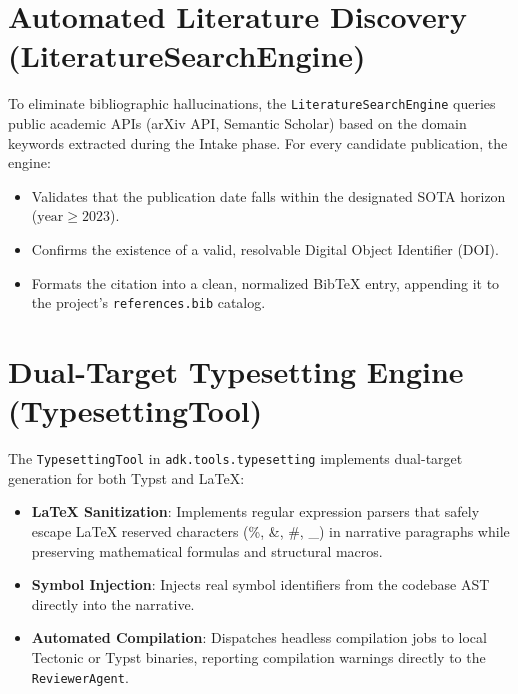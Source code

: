 \section{Automated Literature Discovery (LiteratureSearchEngine)}
\label{sec:literature_search_impl}

To eliminate bibliographic hallucinations, the \texttt{LiteratureSearchEngine} queries public academic APIs (arXiv API, Semantic Scholar) based on the domain keywords extracted during the Intake phase. For every candidate publication, the engine:
\begin{itemize}
    \item Validates that the publication date falls within the designated SOTA horizon ($\text{year} \ge 2023$).
    \item Confirms the existence of a valid, resolvable Digital Object Identifier (DOI).
    \item Formats the citation into a clean, normalized BibTeX entry, appending it to the project's \texttt{references.bib} catalog.
\end{itemize}

\section{Dual-Target Typesetting Engine (TypesettingTool)}
\label{sec:typesetting_impl}

The \texttt{TypesettingTool} in \texttt{adk.tools.typesetting} implements dual-target generation for both Typst and LaTeX:
\begin{itemize}
    \item \textbf{LaTeX Sanitization}: Implements regular expression parsers that safely escape LaTeX reserved characters (\%, \&, \#, \_) in narrative paragraphs while preserving mathematical formulas and structural macros.
    \item \textbf{Symbol Injection}: Injects real symbol identifiers from the codebase AST directly into the narrative.
    \item \textbf{Automated Compilation}: Dispatches headless compilation jobs to local Tectonic or Typst binaries, reporting compilation warnings directly to the \texttt{ReviewerAgent}.
\end{itemize}

